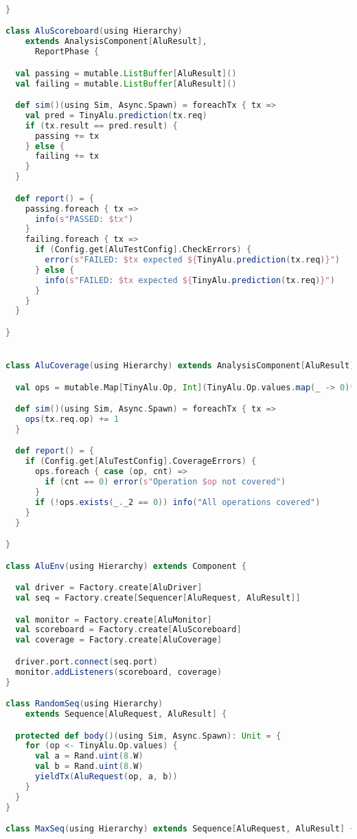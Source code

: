 \begin{lstlisting}[language=scala, captionpos=b, caption=Test code for the tiny ALU.,label=lst:alu_test]
  
}

class AluScoreboard(using Hierarchy)
    extends AnalysisComponent[AluResult],
      ReportPhase {

  val passing = mutable.ListBuffer[AluResult]()
  val failing = mutable.ListBuffer[AluResult]()

  def sim()(using Sim, Async.Spawn) = foreachTx { tx =>
    val pred = TinyAlu.prediction(tx.req)
    if (tx.result == pred.result) {
      passing += tx
    } else {
      failing += tx
    }
  }

  def report() = {
    passing.foreach { tx =>
      info(s"PASSED: $tx")
    }
    failing.foreach { tx =>
      if (Config.get[AluTestConfig].CheckErrors) {
        error(s"FAILED: $tx expected ${TinyAlu.prediction(tx.req)}")
      } else {
        info(s"FAILED: $tx expected ${TinyAlu.prediction(tx.req)}")
      }
    }
  }

}


class AluCoverage(using Hierarchy) extends AnalysisComponent[AluResult] {

  val ops = mutable.Map[TinyAlu.Op, Int](TinyAlu.Op.values.map(_ -> 0)*)

  def sim()(using Sim, Async.Spawn) = foreachTx { tx =>
    ops(tx.req.op) += 1
  }

  def report() = {
    if (Config.get[AluTestConfig].CoverageErrors) {
      ops.foreach { case (op, cnt) =>
        if (cnt == 0) error(s"Operation $op not covered")
      }
      if (!ops.exists(_._2 == 0)) info("All operations covered")
    }
  }

}

class AluEnv(using Hierarchy) extends Component {

  val driver = Factory.create[AluDriver]
  val seq = Factory.create[Sequencer[AluRequest, AluResult]]

  val monitor = Factory.create[AluMonitor]
  val scoreboard = Factory.create[AluScoreboard]
  val coverage = Factory.create[AluCoverage]

  driver.port.connect(seq.port)
  monitor.addListeners(scoreboard, coverage)
}

class RandomSeq(using Hierarchy)
    extends Sequence[AluRequest, AluResult] {

  protected def body()(using Sim, Async.Spawn): Unit = {
    for (op <- TinyAlu.Op.values) {
      val a = Rand.uint(8.W)
      val b = Rand.uint(8.W)
      yieldTx(AluRequest(op, a, b))
    }
  }
}

class MaxSeq(using Hierarchy) extends Sequence[AluRequest, AluResult] {


\end{lstlisting}

